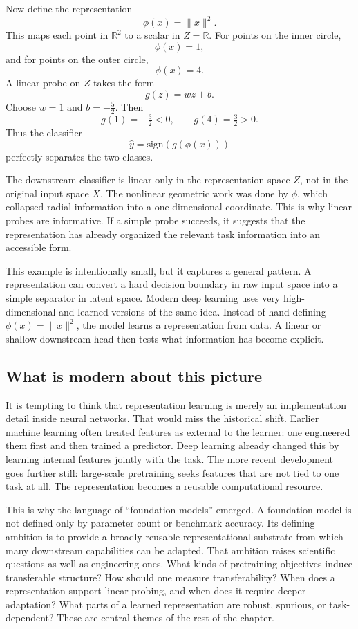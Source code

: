 Now define the representation
\[
\phi(x) = \|x\|^2.
\]
This maps each point in \(\mathbb{R}^2\) to a scalar in \(Z = \mathbb{R}\).
For points on the inner circle,
\[
\phi(x) = 1,
\]
and for points on the outer circle,
\[
\phi(x) = 4.
\]
A linear probe on \(Z\) takes the form
\[
g(z) = wz + b.
\]
Choose \(w = 1\) and \(b = -\tfrac52\).
Then
\[
g(1) = -\tfrac32 < 0,
\qquad
 g(4) = \tfrac32 > 0.
\]
Thus the classifier
\[
\hat y = \mathrm{sign}(g(\phi(x)))
\]
perfectly separates the two classes.

\begin{example}
The downstream classifier is linear only in the representation space \(Z\), not in the original input space \(X\).
The nonlinear geometric work was done by \(\phi\), which collapsed radial information into a one-dimensional coordinate.
This is why linear probes are informative.
If a simple probe succeeds, it suggests that the representation has already organized the relevant task information into an accessible form.
\end{example}

This example is intentionally small, but it captures a general pattern.
A representation can convert a hard decision boundary in raw input space into a simple separator in latent space.
Modern deep learning uses very high-dimensional and learned versions of the same idea.
Instead of hand-defining \(\phi(x)=\|x\|^2\), the model learns a representation from data.
A linear or shallow downstream head then tests what information has become explicit.

\subsection*{What is modern about this picture}

It is tempting to think that representation learning is merely an implementation detail inside neural networks.
That would miss the historical shift.
Earlier machine learning often treated features as external to the learner: one engineered them first and then trained a predictor.
Deep learning already changed this by learning internal features jointly with the task.
The more recent development goes further still:
large-scale pretraining seeks features that are not tied to one task at all.
The representation becomes a reusable computational resource.

This is why the language of ``foundation models'' emerged.
A foundation model is not defined only by parameter count or benchmark accuracy.
Its defining ambition is to provide a broadly reusable representational substrate from which many downstream capabilities can be adapted.
That ambition raises scientific questions as well as engineering ones.
What kinds of pretraining objectives induce transferable structure?
How should one measure transferability?
When does a representation support linear probing, and when does it require deeper adaptation?
What parts of a learned representation are robust, spurious, or task-dependent?
These are central themes of the rest of the chapter.


